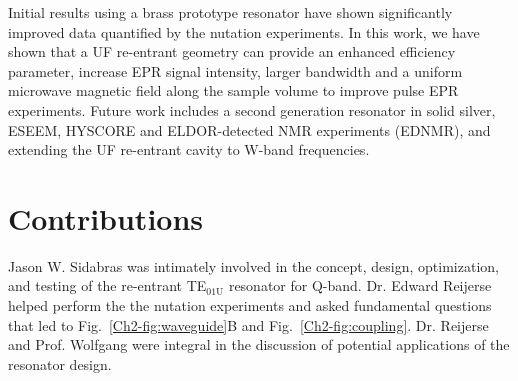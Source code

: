 Initial results using a brass prototype resonator have shown significantly improved data quantified by the nutation experiments. In this work, we have shown that a UF re-entrant geometry can provide an enhanced efficiency parameter, increase EPR signal intensity, larger bandwidth and a uniform microwave magnetic field along the sample volume to improve pulse EPR experiments. Future work includes a second generation resonator in solid silver, ESEEM, HYSCORE and ELDOR-detected NMR experiments (EDNMR), and extending the UF re-entrant \cylTE{} cavity to W-band frequencies.



\section*{Contributions}
Jason W. Sidabras was intimately involved in the concept, design, optimization, and testing of the re-entrant TE$_{01\text{U}}$ resonator for Q-band. Dr. Edward Reijerse helped perform the the nutation experiments and asked fundamental questions that led to Fig.~\ref{Ch2-fig:waveguide}B and Fig.~\ref{Ch2-fig:coupling}. Dr. Reijerse and Prof. Wolfgang were integral in the discussion of potential applications of the resonator design.

{\renewcommand{\bibsection}{\clearpage\section*{\bibname}\markboth{\bibname}{\bibname}}
\renewcommand{\bibname}{CHAPTER 3. REFERENCES}

}